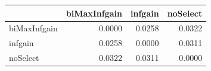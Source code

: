 \begin{tabular}{lrrr}
\toprule
 & biMaxInfgain & infgain & noSelect \\
\midrule
biMaxInfgain & 0.0000 & 0.0258 & 0.0322 \\
infgain & 0.0258 & 0.0000 & 0.0311 \\
noSelect & 0.0322 & 0.0311 & 0.0000 \\
\bottomrule
\end{tabular}
